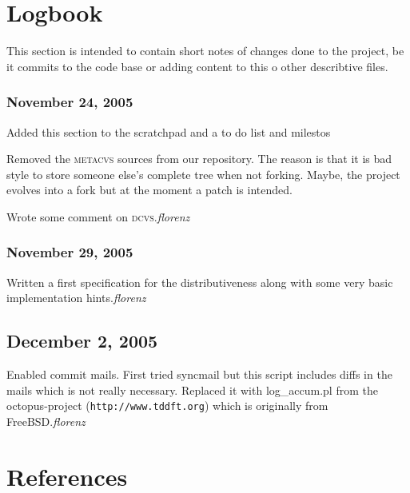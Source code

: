 \documentclass[fleqn, german, 10pt, a4paper]{article}
\begin{document}
\section{Logbook}

This section is intended to contain short notes of changes done to the
project, be it commits to the code base or adding content to this o
other describtive files.

\subsubsection*{November 24, 2005}
Added this section to the scratchpad and a to do list and milestos

Removed the \textsc{metacvs} sources from our repository. The reason is
that it is bad style to store someone else's complete tree when not forking.
Maybe, the project evolves into a fork but at the moment a patch is
intended.

Wrote some comment on \textsc{dcvs}.\hfill{\textit{florenz}}


\subsubsection*{November 29, 2005}

Written a first specification for the distributiveness along with some
very basic implementation hints.\hfill{\textit{florenz}}


\subsection*{December 2, 2005}

Enabled commit mails. First tried syncmail but this script includes
diffs in the mails which is not really necessary. Replaced it with
log_accum.pl from the octopus-project (\texttt{http://www.tddft.org})
which is originally from FreeBSD.\hfill{\textit{florenz}}

\section{References}
\end{document}
